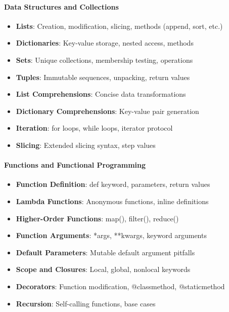 \paragraph{Data Structures and Collections \starfull\starfull\starfull\starfull\starempty}
\begin{itemize}
\item[\checkmark] \textbf{Lists}: Creation, modification, slicing, methods (append, sort, etc.)
\item[\checkmark] \textbf{Dictionaries}: Key-value storage, nested access, methods
\item[\checkmark] \textbf{Sets}: Unique collections, membership testing, operations
\item[\checkmark] \textbf{Tuples}: Immutable sequences, unpacking, return values
\item[\checkmark] \textbf{List Comprehensions}: Concise data transformations
\item[\checkmark] \textbf{Dictionary Comprehensions}: Key-value pair generation
\item[\checkmark] \textbf{Iteration}: for loops, while loops, iterator protocol
\item[\checkmark] \textbf{Slicing}: Extended slicing syntax, step values
\end{itemize}

\paragraph{Functions and Functional Programming \starfull\starfull\starfull\starfull\starempty}
\begin{itemize}
\item[\checkmark] \textbf{Function Definition}: def keyword, parameters, return values
\item[\checkmark] \textbf{Lambda Functions}: Anonymous functions, inline definitions
\item[\checkmark] \textbf{Higher-Order Functions}: map(), filter(), reduce()
\item[\checkmark] \textbf{Function Arguments}: *args, **kwargs, keyword arguments
\item[\checkmark] \textbf{Default Parameters}: Mutable default argument pitfalls
\item[\checkmark] \textbf{Scope and Closures}: Local, global, nonlocal keywords
\item[\checkmark] \textbf{Decorators}: Function modification, @classmethod, @staticmethod
\item[\checkmark] \textbf{Recursion}: Self-calling functions, base cases
\end{itemize}

